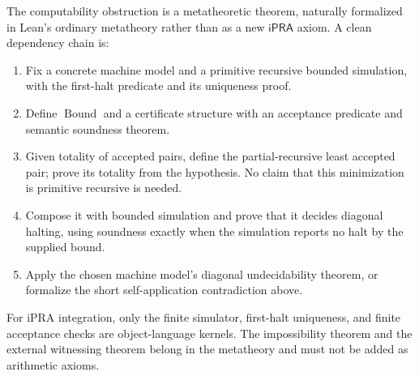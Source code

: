 The computability obstruction is a metatheoretic theorem, naturally
formalized in Lean's ordinary metatheory rather than as a new
$\mathsf{iPRA}$ axiom. A clean dependency chain is:
\begin{enumerate}
\item Fix a concrete machine model and a primitive recursive bounded
simulation, with the first-halt predicate and its uniqueness proof.
\item Define $\operatorname{Bound}$ and a certificate structure with
an acceptance predicate and semantic soundness theorem.
\item Given totality of accepted pairs, define the partial-recursive
least accepted pair; prove its totality from the hypothesis. No claim
that this minimization is primitive recursive is needed.
\item Compose it with bounded simulation and prove that it decides
diagonal halting, using soundness exactly when the simulation reports
no halt by the supplied bound.
\item Apply the chosen machine model's diagonal undecidability
theorem, or formalize the short self-application contradiction above.
\end{enumerate}
For iPRA integration, only the finite simulator, first-halt uniqueness,
and finite acceptance checks are object-language kernels. The
impossibility theorem and the external witnessing theorem belong in
the metatheory and must not be added as arithmetic axioms.


